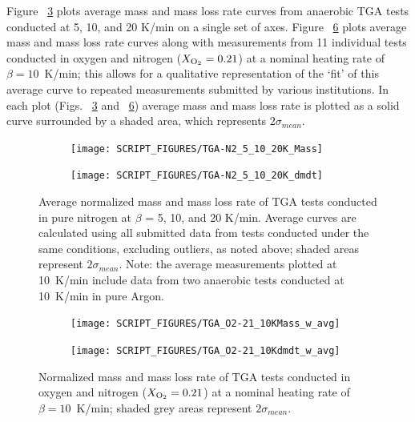\documentclass{book}
\begin{document}
Figure ~\ref{Fig:TGA-N2_5_10_20K} plots average mass and mass loss rate curves from anaerobic TGA tests conducted at 5, 10, and 20 K/min on a single set of axes. Figure ~\ref{Fig:TGA_O2-21_10K_w_avg} plots average mass and mass loss rate curves along with measurements from 11 individual tests conducted in oxygen and nitrogen ($X_{\rm O_2}=0.21$) at a nominal heating rate of $\beta=10$~K/min; this allows for a qualitative representation of the ‘fit’ of this average curve to repeated measurements submitted by various institutions. In each plot (Figs. ~\ref{Fig:TGA-N2_5_10_20K} and ~\ref{Fig:TGA_O2-21_10K_w_avg}) average mass and mass loss rate is plotted as a solid curve surrounded by a shaded area, which represents $2\sigma_{mean}$.

\begin{figure}
\centering
\begin{subfigure}[b]{0.85\textwidth}
   \texttt{[image: SCRIPT\_FIGURES/TGA-N2\_5\_10\_20K\_Mass]}
   \caption{}
   \label{Fig:TGA-N2_5_10_20K_Mass} 
\end{subfigure}

\begin{subfigure}[b]{0.85\textwidth}
   \texttt{[image: SCRIPT\_FIGURES/TGA-N2\_5\_10\_20K\_dmdt]}
   \caption{}
   \label{Fig:TGA-N2_5_10_20K_dmdt} 
\end{subfigure}
  
  \caption{Average normalized mass and mass loss rate of TGA tests conducted in pure nitrogen at $\beta$ = 5, 10, and 20 K/min. Average curves are calculated using all submitted data from tests conducted under the same conditions, excluding outliers, as noted above; shaded areas represent $2\sigma_{mean}$. Note: the average measurements plotted at 10~K/min include data from two anaerobic tests conducted at 10~K/min in pure Argon.}
  \label{Fig:TGA-N2_5_10_20K}
\end{figure}


\begin{figure}
\centering
\begin{subfigure}[b]{0.85\textwidth}
   \texttt{[image: SCRIPT\_FIGURES/TGA\_O2-21\_10KMass\_w\_avg]}
   \caption{}
   \label{Fig:TGA_O2-21_10KMass_w_avg} 
\end{subfigure}

\begin{subfigure}[b]{0.85\textwidth}
   \texttt{[image: SCRIPT\_FIGURES/TGA\_O2-21\_10Kdmdt\_w\_avg]}
   \caption{}
   \label{Fig:TGA_O2-21_10Kdmdt_w_avg} 
\end{subfigure}  
  
  \caption{Normalized mass and mass loss rate of TGA tests conducted in oxygen and nitrogen ($X_{\rm O_2}=0.21$) at a nominal heating rate of $\beta=10$~K/min; shaded grey areas represent $2\sigma_{mean}$.}
  \label{Fig:TGA_O2-21_10K_w_avg}
\end{figure}
\end{document}
